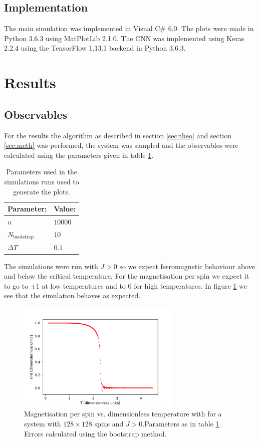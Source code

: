 \documentclass[10 pt, a4paper]{article}
\begin{document}
\subsection{Implementation}

The main simulation was implemented in Visual C\# 6.0. The plots were made in Python 3.6.3 using MatPlotLib 2.1.0. The CNN was implemented using Keras 2.2.4 using the TensorFlow 1.13.1 backend in Python 3.6.3.


\section{Results} \label{sec:results}

\subsection{Observables}

For the results the algorithm as described in section \ref{sec:theo} and section \ref{sec:meth} was performed, the system was sampled and the observables were calculated using the parameters given in table \ref{tab:params}. 


\begin{table}[H]
\centering
\begin{tabular}{l|l}
Parameter: & Value:                                           \\ \hline
$n$ & $10000$       \\
$N_\mathrm{bootstrap}$          & $10$                                   \\
$\Delta T$          & $0.1$         \\                                   
\end{tabular}
\caption{Parameters used in the simulations runs used to generate the plots. \label{tab:params}}
\end{table}

The simulations were run with $J > 0$ so we expect ferromagnetic behaviour above and below the critical temperature. For the magnetisation per spin we expect it to go to $\pm 1$ at low temperatures and to 0 for high temperatures. In figure \ref{fig:mag128} we see that the simulation behaves as expected. 

\begin{figure}[H]
\centering
\includegraphics[width=0.7\textwidth]{mag128}
\caption{Magnetisation per spin vs. dimensionless temperature with for a system with $128 \times 128$ spins and $J > 0$.Parameters as in table \ref{tab:params}. Errors calculated using the bootstrap method. \label{fig:mag128}}
\end{figure}
\end{document}
